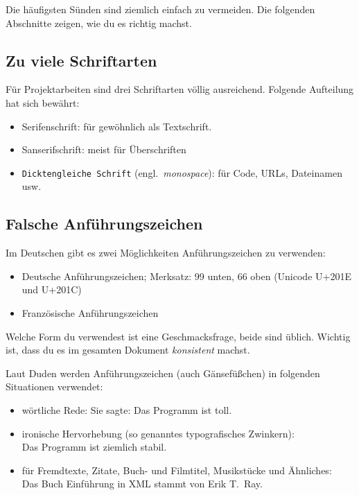 \documentclass[a4paper,titlepage=true,twoside]{scrartcl}
\newcommand{\gquote}[1]{\glqq #1\grqq}
\newcommand{\fquote}[1]{\frqq #1\flqq}
\begin{document}

Die häufigsten Sünden sind ziemlich einfach zu vermeiden. Die folgenden
Abschnitte zeigen, wie du es richtig machst.

\subsection{Zu viele Schriftarten}
Für Projektarbeiten sind drei Schriftarten völlig ausreichend. Folgende 
Aufteilung hat sich bewährt:

\begin{itemize}
 \item Serifenschrift: für gewöhnlich als Textschrift.
 \item \textsf{Sanserifschrift}: meist für Überschriften
 \item \verb!Dicktengleiche Schrift! (engl.~\emph{monospace}): für Code, URLs, Dateinamen usw.
\end{itemize}


\subsection{Falsche Anführungszeichen}
Im Deutschen gibt es zwei Möglichkeiten Anführungszeichen zu verwenden:

\begin{itemize}
 \item \gquote{Deutsche Anführungszeichen}; Merksatz: 99 unten, 66 oben (Unicode U+201E und U+201C)
 \item \fquote{Französische Anführungszeichen}
\end{itemize}

Welche Form du verwendest ist eine Geschmacksfrage, beide sind üblich. Wichtig ist, 
dass du es im gesamten Dokument \emph{konsistent} machst.

Laut Duden werden Anführungszeichen (auch \gquote{Gänsefüßchen}) in
folgenden Situationen verwendet:

\begin{itemize}
 \item wörtliche Rede: Sie sagte: \gquote{Das Programm ist toll.}
 \item ironische Hervorhebung (so genanntes \gquote{typografisches Zwinkern}):\\
 Das Programm ist \gquote{ziemlich} stabil.
 \item für Fremdtexte, Zitate, Buch- und Filmtitel, Musikstücke und Ähnliches:\\
 Das Buch \gquote{Einführung in XML} stammt von Erik T.\ Ray.
\end{itemize}
\end{document}
